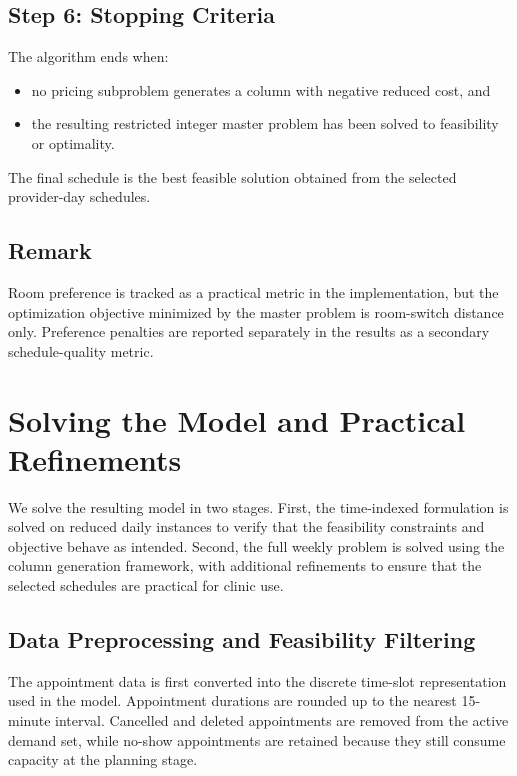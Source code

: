 \documentclass[12pt]{article}
\begin{document}
\subsection*{Step 6: Stopping Criteria}

The algorithm ends when:
\begin{itemize}
  \item no pricing subproblem generates a column with negative reduced cost, and
  \item the resulting restricted integer master problem has been solved to feasibility or optimality.
\end{itemize}

The final schedule is the best feasible solution obtained from the selected provider-day schedules.

\subsection*{Remark}

Room preference is tracked as a practical metric in the implementation, but the optimization
objective minimized by the master problem is room-switch distance only. Preference penalties
are reported separately in the results as a secondary schedule-quality metric.

\section{Solving the Model and Practical Refinements}

We solve the resulting model in two stages. First, the time-indexed formulation is solved on
reduced daily instances to verify that the feasibility constraints and objective behave as intended.
Second, the full weekly problem is solved using the column generation framework, with additional
refinements to ensure that the selected schedules are practical for clinic use.

\subsection*{Data Preprocessing and Feasibility Filtering}

The appointment data is first converted into the discrete time-slot representation used in the
model. Appointment durations are rounded up to the nearest 15-minute interval. Cancelled and
deleted appointments are removed from the active demand set, while no-show appointments are
retained because they still consume capacity at the planning stage.
\end{document}
